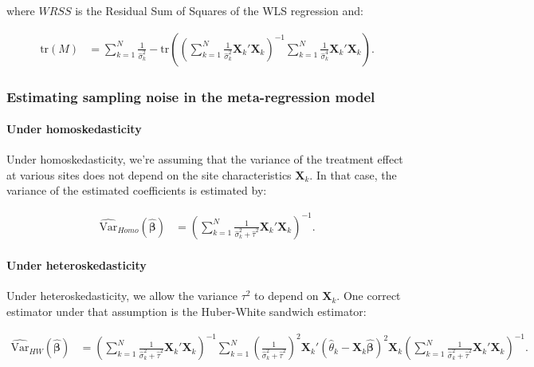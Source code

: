 \documentclass[]{book}
\let\oldparagraph\paragraph
\renewcommand{\paragraph}[1]{\oldparagraph{#1}\mbox{}}
\theoremstyle{definition}
\theoremstyle{definition}
\theoremstyle{definition}
\theoremstyle{remark}
\begin{document}
where \(WRSS\) is the Residual Sum of Squares of the WLS regression and:

\begin{align*}
\text{tr}(M) & = \sum_{k=1}^N\frac{1}{\hat{\sigma}^2_k} -\text{tr}\left(\left(\sum_{k=1}^N\frac{1}{\hat{\sigma}^2_k}\mathbf{X}_k'\mathbf{X}_k\right)^{-1}\sum_{k=1}^N\frac{1}{\hat{\sigma}^4_k}\mathbf{X}_k'\mathbf{X}_k\right).
\end{align*}

\hypertarget{estimating-sampling-noise-in-the-meta-regression-model}{%
\subsubsection{Estimating sampling noise in the meta-regression model}\label{estimating-sampling-noise-in-the-meta-regression-model}}

\hypertarget{under-homoskedasticity}{%
\paragraph{Under homoskedasticity}\label{under-homoskedasticity}}

Under homoskedasticity, we're assuming that the variance of the treatment effect at various sites does not depend on the site characteristics \(\mathbf{X}_k\).
In that case, the variance of the estimated coefficients is estimated by:

\begin{align*}
\hat{\text{Var}}_{Homo}(\hat{\mathbf{\beta}}) & = \left(\sum_{k=1}^N\frac{1}{\hat{\sigma}^2_k+\hat{\tau}^2}\mathbf{X}_k'\mathbf{X}_k\right)^{-1}.
\end{align*}

\hypertarget{under-heteroskedasticity}{%
\paragraph{Under heteroskedasticity}\label{under-heteroskedasticity}}

Under heteroskedasticity, we allow the variance \(\tau^2\) to depend on \(\mathbf{X}_k\).
One correct estimator under that assumption is the Huber-White sandwich estimator:

\begin{align*}
\hat{\text{Var}}_{HW}(\hat{\mathbf{\beta}}) & = \left(\sum_{k=1}^N\frac{1}{\hat{\sigma}^2_k+\hat{\tau}^2}\mathbf{X}_k'\mathbf{X}_k\right)^{-1}
                                                  \sum_{k=1}^N\left(\frac{1}{\hat{\sigma}^2_k+\hat{\tau}^2}\right)^2
                                                  \mathbf{X}_k'(\hat{\theta}_k-\mathbf{X}_k\hat{\mathbf{\beta}})^2\mathbf{X}_k
                                                  \left(\sum_{k=1}^N\frac{1}{\hat{\sigma}^2_k+\hat{\tau}^2}\mathbf{X}_k'\mathbf{X}_k\right)^{-1}.
\end{align*}
\end{document}
